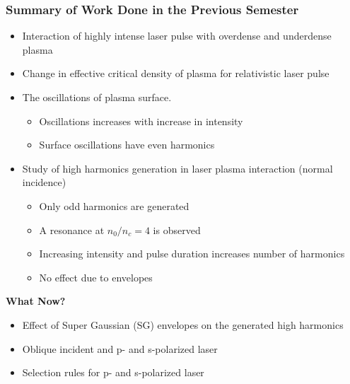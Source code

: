 \documentclass{beamer}
\begin{document}
\begin{frame}
    \frametitle{Summary of Work Done in the Previous Semester}
    \small
    \begin{itemize}
        \item Interaction of highly intense laser pulse with overdense and underdense plasma
        \item Change in effective critical density of plasma for relativistic laser pulse
        \item The oscillations of plasma surface.
              \begin{itemize}
                  \item Oscillations increases with increase in intensity
                  \item Surface oscillations have even harmonics
              \end{itemize}
        \item Study of high harmonics generation in laser plasma interaction (normal incidence)
              \begin{itemize}
                  \item Only odd harmonics are generated
                  \item A resonance at $n_0/n_c=4$ is observed
                  \item Increasing intensity and pulse duration increases number of harmonics
                  \item No effect due to envelopes
              \end{itemize}
    \end{itemize}

    \textbf{What Now?}
    \begin{itemize}
        \item Effect of Super Gaussian (SG) envelopes on the generated high harmonics
        \item Oblique incident and p- and s-polarized laser
        \item Selection rules for p- and s-polarized laser
    \end{itemize}
\end{frame}
\end{document}

